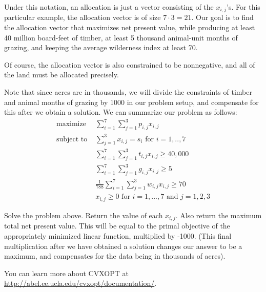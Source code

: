 Under this notation, an allocation is just a vector consisting of the $x_{i,j}$'s. For this particular
example, the allocation vector is of size $7\cdot 3 = 21$. 
Our goal is to find the allocation vector that maximizes net present value, while producing at least 40 million
board-feet of timber, at least 5 thousand animal-unit months of grazing, and keeping the average wilderness index at least 70.

Of course, the allocation vector is also constrained to be nonnegative, and all of the land must be allocated precisely. 

Note that since acres are in thousands, we will divide the constraints of timber and animal months of grazing by 1000 in our problem setup, and compensate for this after we obtain a solution. We can summarize our problem as follows:
\begin{align*}
\text{maximize } &\sum\limits_{i=1}^7 \sum\limits_{j=1}^3 p_{i,j}x_{i,j} \\
\text{subject to } &\sum\limits_{j=1}^3 x_{i,j} = s_i  \text{ for } i=1,..,7 \\
	        &\sum\limits_{i=1}^7 \sum\limits_{j=1}^3 t_{i,j}x_{i,j} \geq 40,000 \\
		&\sum\limits_{i=1}^7 \sum\limits_{j=1}^3 g_{i,j}x_{i,j} \geq 5 \\
		&\frac{1}{788} \sum\limits_{i=1}^7 \sum\limits_{j=1}^3 w_{i,j}x_{i,j} \geq 70 \\
		&x_{i,j} \geq 0 \text{ for } i=1,...,7  \text{ and } j=1,2,3
\end{align*}

\begin{problem}
Solve the problem above. Return the value of each $x_{i,j}$. 
Also return the maximum total net present value. This will be equal to the primal objective of the appropriately minimized linear function, multiplied by -1000. (This final multiplication after we have obtained a solution changes our answer to be a maximum, and compensates for the data being in thousands of acres).
\end{problem} 

You can learn more about CVXOPT at
\url{http://abel.ee.ucla.edu/cvxopt/documentation/}.
